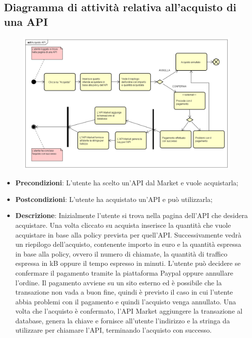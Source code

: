 \newpage
\subsection{Diagramma di attività relativa all'acquisto di una API}
\begin{figure}[h]
	\centering
	\includegraphics[width=1.0\linewidth]{IMG/Acquisto_API}
	\caption{}
	\label{fig:acquistoapi}
\end{figure}

\begin{itemize}
	\item \textbf{Precondizioni}: L'utente ha scelto un'API dal Market e vuole acquistarla;
	\item \textbf{Postcondizioni}: L'utente ha acquistato un'API e può utilizzarla;
	\item \textbf{Descrizione}: Inizialmente l'utente si trova nella pagina dell'API che desidera acquistare. Una volta cliccato su acquista inserisce la quantità che vuole acquistare in base alla policy prevista per quell'API. Successivamente vedrà un riepilogo dell'acquisto, contenente importo in euro e la quantità espressa in base alla policy, ovvero il numero di chiamate, la quantità di traffico espressa in kB oppure il tempo espresso in minuti. L'utente può decidere se confermare il pagamento tramite la piattaforma Paypal oppure annullare l'ordine. Il pagamento avviene su un sito esterno ed è possibile che la transazione non vada a buon fine, quindi è previsto il caso in cui l'utente abbia problemi con il pagamento e quindi l'acquisto venga annullato. Una volta che l'acquisto è confermato, l'API Market aggiungere la transazione al database, genera la chiave e fornisce all'utente l'indirizzo e la stringa da utilizzare per chiamare l'API, terminando l'acquisto con successo. 
\end{itemize}

